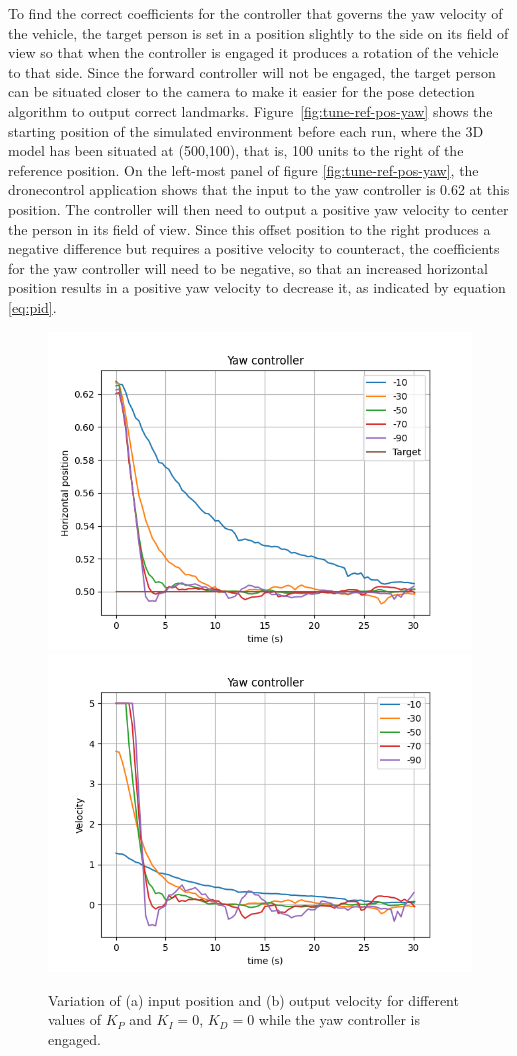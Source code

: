 To find the correct coefficients for the controller that governs the yaw velocity of the vehicle, the target person is set in a position slightly to the side on its field of view so that when the controller is engaged it produces a rotation of the vehicle to that side.
Since the forward controller will not be engaged, the target person can be situated closer to the camera to make it easier for the pose detection algorithm to output correct landmarks.
Figure~\ref{fig:tune-ref-pos-yaw} shows the starting position of the simulated environment before each run, where the 3D model has been situated at (500,100), that is, 100 units to the right of the reference position.
On the left-most panel of figure \ref{fig:tune-ref-pos-yaw}, the dronecontrol application shows that the input to the yaw controller is 0.62 at this position.
The controller will then need to output a positive yaw velocity to center the person in its field of view. 
Since this offset position to the right produces a negative difference but requires a positive velocity to counteract, the coefficients for the yaw controller will need to be negative, so that an increased horizontal position results in a positive yaw velocity to decrease it, as indicated by equation \ref{eq:pid}.
        

\begin{figure}
  \centering
  \includegraphics[width=.45\linewidth]{img/pid/yaw/yaw_pos_prop_i0_d0.png}
  \includegraphics[width=.45\linewidth]{img/pid/yaw/yaw_vel_prop_i0_d0.png}
  \caption{Variation of (a) input position and (b) output velocity for different values of $K_{P}$ and $K_I=0$, $K_D=0$ while the yaw controller is engaged.}\label{fig:tune-yaw-prop}
\end{figure}

